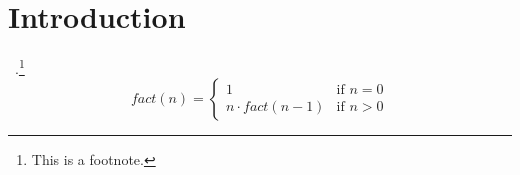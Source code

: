 \section{Introduction}\label{sec:introduction}

\lipsum[1]~\cite{Scribe25}.\footnote{This is a footnote.}
\begin{equation*}
	fact(n) = \begin{cases}
		1                 & \text{if } n = 0 \\
		n \cdot fact(n-1) & \text{if } n > 0
	\end{cases}
\end{equation*}
\lipsum[1]
\lipsum[2]

